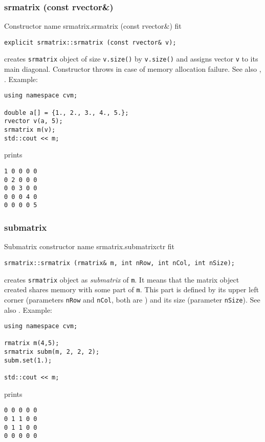 \subsubsection{srmatrix (const rvector\&)}
Constructor%
\pdfdest name {srmatrix.srmatrix (const rvector&)} fit
\begin{verbatim}
explicit srmatrix::srmatrix (const rvector& v);
\end{verbatim}
creates  \verb"srmatrix" object
of size \verb"v.size()" by \verb"v.size()"
and assigns vector \verb"v" to its main diagonal.
Constructor throws  
in case of memory allocation failure.
See also , .
Example:
\begin{Verbatim}
using namespace cvm;

double a[] = {1., 2., 3., 4., 5.};
rvector v(a, 5);
srmatrix m(v);
std::cout << m;
\end{Verbatim}
prints
\begin{Verbatim}
1 0 0 0 0
0 2 0 0 0
0 0 3 0 0
0 0 0 4 0
0 0 0 0 5
\end{Verbatim}
\newpage



\subsubsection{submatrix}
Submatrix constructor%
\pdfdest name {srmatrix.submatrixctr} fit
\begin{verbatim}
srmatrix::srmatrix (rmatrix& m, int nRow, int nCol, int nSize);
\end{verbatim}
creates  \verb"srmatrix" object as  \emph{submatrix} of \verb"m".
It means that the matrix object created shares  memory with some part
of \verb"m". This part is defined by its upper left corner (parameters 
\verb"nRow" and \verb"nCol", both are \Based)
and its size (parameter \verb"nSize").
See also .
Example:
\begin{Verbatim}
using namespace cvm;

rmatrix m(4,5);
srmatrix subm(m, 2, 2, 2);
subm.set(1.);

std::cout << m;
\end{Verbatim}
prints
\begin{Verbatim}
0 0 0 0 0
0 1 1 0 0
0 1 1 0 0
0 0 0 0 0
\end{Verbatim}
\newpage



